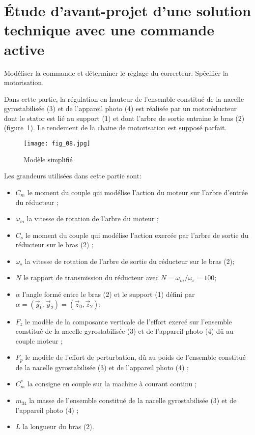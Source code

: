\section{\label{part:4} Étude d'avant-projet d'une solution technique avec une commande active }

\begin{obj}
Modéliser la commande et déterminer le réglage du correcteur. Spécifier la motorisation.
\end{obj}

\ifprof
\else
Dans cette partie, la régulation en hauteur de l'ensemble constitué de la nacelle gyrostabilisée (3) et de l'appareil photo (4) est réalisée par un motoréducteur dont le stator est lié au support (1) et dont l'arbre de sortie entraine le bras (2) (figure~\ref{fig:08}). Le rendement de la chaine de motorisation est supposé parfait.

\begin{figure}[H]
\centering
\texttt{[image: fig\_08.jpg]}
\caption{\label{fig:08} Modèle simplifié}
\end{figure}

 Les grandeurs utilisées dans cette partie sont:

\begin{itemize}
  \item $C_{m}$ le moment du couple qui modélise l'action du moteur sur l'arbre d'entrée du réducteur ;
  \item $\omega_{m}$ la vitesse de rotation de l'arbre du moteur ;
  \item $C_{s}$ le moment du couple qui modélise l'action exercée par l'arbre de sortie du réducteur sur le bras (2) ;
  \item $\omega_{s}$ la vitesse de rotation de l'arbre de sortie du réducteur sur le bras (2);
  \item $N$ le rapport de transmission du réducteur avec $N=\omega_{m} / \omega_{s}=100$;
  \item $\alpha$ l'angle formé entre le bras (2) et le support (1) défini par $\alpha=\left(\vec{y}_{0}, \vec{y}_{2}\right)=\left(\vec{z}_{0}, \vec{z}_{2}\right)$;
  \item $F_{z}$ le modèle de la composante verticale de l'effort exercé sur l'ensemble constitué de la nacelle gyrostabilisée (3) et de l'appareil photo (4) dû au couple moteur ;
  \item $F_{p}$ le modèle de l'effort de perturbation, dû au poids de l'ensemble constitué de la nacelle gyrostabilisée (3) et de l'appareil photo (4) ;
  \item $C_{m}^{*}$ la consigne en couple sur la machine à courant continu ;
  \item $m_{34}$ la masse de l'ensemble constitué de la nacelle gyrostabilisée (3) et de l'appareil photo (4) ;
  \item $L$ la longueur du bras (2).
\end{itemize}

